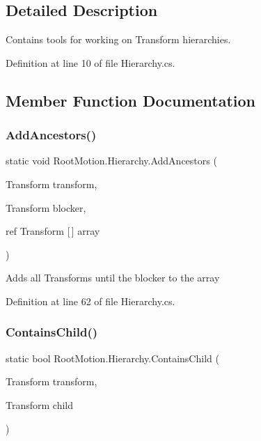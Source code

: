 \subsection{Detailed Description}
Contains tools for working on Transform hierarchies. 



Definition at line 10 of file Hierarchy.\+cs.



\subsection{Member Function Documentation}
\mbox{\label{class_root_motion_1_1_hierarchy_a77f26ed493417b1df026c76447557cd7}} 
\subsubsection{\texorpdfstring{Add\+Ancestors()}{AddAncestors()}}
{\footnotesize\ttfamily static void Root\+Motion.\+Hierarchy.\+Add\+Ancestors (\begin{DoxyParamCaption}\item[{Transform}]{transform,  }\item[{Transform}]{blocker,  }\item[{ref Transform \mbox{[}$\,$\mbox{]}}]{array }\end{DoxyParamCaption})\hspace{0.3cm}{\ttfamily [static]}}



Adds all Transforms until the blocker to the array 



Definition at line 62 of file Hierarchy.\+cs.

\mbox{\label{class_root_motion_1_1_hierarchy_aa124a840cb4f6e896fbb280e5aecf80a}} 
\subsubsection{\texorpdfstring{Contains\+Child()}{ContainsChild()}}
{\footnotesize\ttfamily static bool Root\+Motion.\+Hierarchy.\+Contains\+Child (\begin{DoxyParamCaption}\item[{Transform}]{transform,  }\item[{Transform}]{child }\end{DoxyParamCaption})\hspace{0.3cm}{\ttfamily [static]}}



